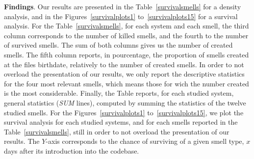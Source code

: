 {\textbf{Findings}. Our results are presented in the Table~\ref{survivalsmells} for a density analysis, and in the Figures~\ref{survivalplots1} to~\ref{survivalplots15} for a survival analysis. 
For the Table~\ref{survivalsmells}, for each system and each smell, the third column corresponds to the number of killed smells, and the fourth to the number of survived smells. The sum of both columns gives us the number of created smells. The fifth column reports, in pourcentage, the proportion of smells created at the files birthdate, relatively to the number of created smells. In order to not overload the presentation of our results, we only report the descriptive statistics for the four most relevant smells, which means those for wich the number created is the most considerable. Finally, the Table reports, for each studied system, general statistics (\textsl{SUM} lines), computed by summing the statistics of the twelve studied smells.
For the Figures~\ref{survivalplots1} to~\ref{survivalplots15}, we plot the survival analysis for each studied systems, and for each smells reported in the Table~\ref{survivalsmells}, still in order to not overload the presentation of our results. The $Y$-axis corresponds to the chance of surviving of a given smell type, $x$ days after its introduction into the codebase.
}
